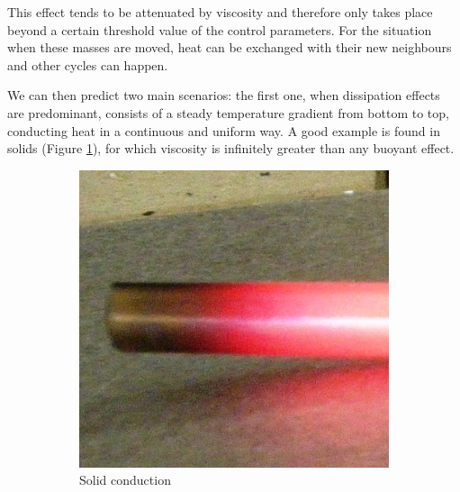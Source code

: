 \documentclass[12pt,oneside]{article}
\begin{document}
This effect tends to be attenuated by viscosity and therefore only takes place beyond a certain threshold value of the control parameters.
For the situation when these masses are moved, heat can be exchanged with their new neighbours and other cycles can happen.

We can then predict two main scenarios: the first one, when dissipation effects are predominant, consists of a steady temperature gradient from bottom to top, conducting heat in a continuous and uniform way. A good example is found in solids (Figure \ref{fig:solid}), for which viscosity is infinitely greater than any buoyant effect.

\begin{figure}[ht]
  \centering
  \begin{subfigure}[b]{0.4\textwidth}
    \includegraphics[width=\textwidth]{solid}
    \caption{Solid conduction}
    \label{fig:solid}
  \end{subfigure}
  \quad
  \begin{subfigure}[b]{0.4\textwidth}

\end{subfigure}
\end{figure}
\end{document}

